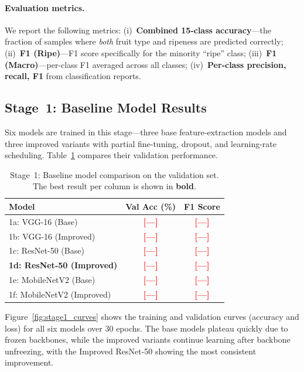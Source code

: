 \documentclass[10pt,twocolumn,letterpaper]{article}
\newcommand{\placeholder}[1]{\textcolor{red}{\textbf{[#1]}}}
\begin{document}
\paragraph{Evaluation metrics.}
We report the following metrics:
(i)~\textbf{Combined 15-class accuracy}---the fraction of samples where \emph{both} fruit type and ripeness are predicted correctly;
(ii)~\textbf{F1 (Ripe)}---F1 score specifically for the minority ``ripe'' class;
(iii)~\textbf{F1 (Macro)}---per-class F1 averaged across all classes;
(iv)~\textbf{Per-class precision, recall, F1} from classification reports.

\subsection{Stage~1: Baseline Model Results}
\label{sec:stage1_results}

Six models are trained in this stage---three base feature-extraction models and three improved variants with partial fine-tuning, dropout, and learning-rate scheduling.
Table~\ref{tab:stage1} compares their validation performance.

\begin{table}[H]
  \centering\small
  \caption{Stage~1: Baseline model comparison on the validation set. The best result per column is shown in \textbf{bold}.}
  \label{tab:stage1}
  \begin{tabular}{lcc}
    \toprule
    \textbf{Model} & \textbf{Val Acc (\%)} & \textbf{F1 Score} \\
    \midrule
    1a: VGG-16 (Base)          & \placeholder{—} & \placeholder{—} \\
    1b: VGG-16 (Improved)      & \placeholder{—} & \placeholder{—} \\
    1c: ResNet-50 (Base)       & \placeholder{—} & \placeholder{—} \\
    \textbf{1d: ResNet-50 (Improved)} & \textbf{\placeholder{—}} & \textbf{\placeholder{—}} \\
    1e: MobileNetV2 (Base)     & \placeholder{—} & \placeholder{—} \\
    1f: MobileNetV2 (Improved) & \placeholder{—} & \placeholder{—} \\
    \bottomrule
  \end{tabular}
\end{table}

Figure~\ref{fig:stage1_curves} shows the training and validation curves (accuracy and loss) for all six models over 30 epochs.
The base models plateau quickly due to frozen backbones, while the improved variants continue learning after backbone unfreezing, with the Improved ResNet-50 showing the most consistent improvement.
\end{document}
